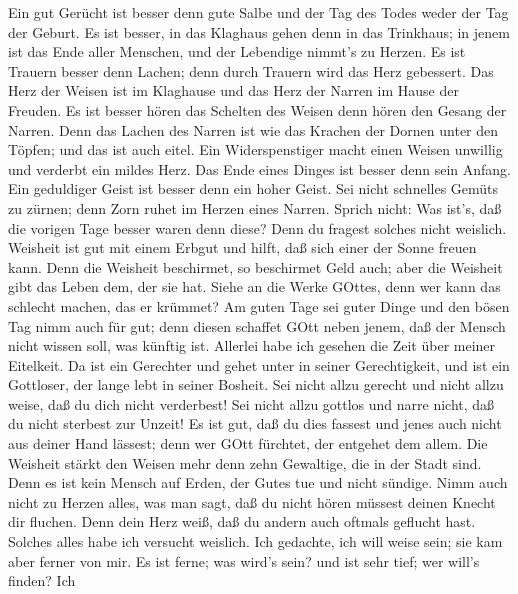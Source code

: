  Ein gut Gerücht ist besser denn gute Salbe und der Tag des
Todes weder der Tag der Geburt.  Es ist besser, in das
Klaghaus gehen denn in das Trinkhaus; in jenem ist das Ende aller
Menschen, und der Lebendige nimmt's zu Herzen.  Es ist
Trauern besser denn Lachen; denn durch Trauern wird das Herz gebessert.
 Das Herz der Weisen ist im Klaghause und das Herz der
Narren im Hause der Freuden.  Es ist besser hören das
Schelten des Weisen denn hören den Gesang der Narren.  Denn
das Lachen des Narren ist wie das Krachen der Dornen unter den Töpfen;
und das ist auch eitel.  Ein Widerspenstiger macht einen
Weisen unwillig und verderbt ein mildes Herz.  Das Ende
eines Dinges ist besser denn sein Anfang. Ein geduldiger Geist ist
besser denn ein hoher Geist.  Sei nicht schnelles Gemüts zu
zürnen; denn Zorn ruhet im Herzen eines Narren.  Sprich
nicht: Was ist's, daß die vorigen Tage besser waren denn diese? Denn du
fragest solches nicht weislich.  Weisheit ist gut mit einem
Erbgut und hilft, daß sich einer der Sonne freuen kann. 
Denn die Weisheit beschirmet, so beschirmet Geld auch; aber die Weisheit
gibt das Leben dem, der sie hat.  Siehe an die Werke
GOttes, denn wer kann das schlecht machen, das er krümmet? 
Am guten Tage sei guter Dinge und den bösen Tag nimm auch für gut; denn
diesen schaffet GOtt neben jenem, daß der Mensch nicht wissen soll, was
künftig ist.  Allerlei habe ich gesehen die Zeit über
meiner Eitelkeit. Da ist ein Gerechter und gehet unter in seiner
Gerechtigkeit, und ist ein Gottloser, der lange lebt in seiner Bosheit.
 Sei nicht allzu gerecht und nicht allzu weise, daß du dich
nicht verderbest!  Sei nicht allzu gottlos und narre nicht,
daß du nicht sterbest zur Unzeit!  Es ist gut, daß du dies
fassest und jenes auch nicht aus deiner Hand lässest; denn wer GOtt
fürchtet, der entgehet dem allem.  Die Weisheit stärkt den
Weisen mehr denn zehn Gewaltige, die in der Stadt sind. 
Denn es ist kein Mensch auf Erden, der Gutes tue und nicht sündige.
 Nimm auch nicht zu Herzen alles, was man sagt, daß du
nicht hören müssest deinen Knecht dir fluchen.  Denn dein
Herz weiß, daß du andern auch oftmals geflucht hast. 
Solches alles habe ich versucht weislich. Ich gedachte, ich will weise
sein; sie kam aber ferner von mir.  Es ist ferne; was
wird's sein? und ist sehr tief; wer will's finden?  Ich
